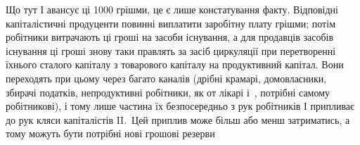 Що тут І авансує ці 1000 грішми, це є лише констатування
факту. Відповідні капіталістичні продуценти повинні виплатити заробітну
плату грішми; потім робітники витрачають ці гроші на засоби
існування, а для продавців засобів існування ці гроші знову таки правлять
за засіб циркуляції при перетворенні їхнього сталого капіталу
з товарового капіталу на продуктивний капітал. Вони переходять при
цьому через багато каналів (дрібні крамарі, домовласники, збирачі
податків, непродуктивні робітники, як от лікарі і~, потрібні самому
робітникові), і тому лише частина їх безпосередньо з рук робітників І
припливає до рук кляси капіталістів II.~Цей приплив може більш або
менш затриматись, а тому можуть бути потрібні нові грошові резерви
\parbreak{}  %
